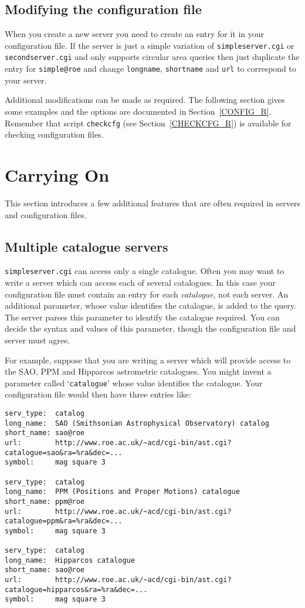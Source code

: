 \documentclass[twoside,11pt]{article}
\newcommand{\xlabel}[1]{}
\renewcommand{\_}{\texttt{\symbol{95}}}
\begin{document}
\subsection{Modifying the configuration file}

When you create a new server you need to create an entry for it in
your configuration file.  If the server is just a simple variation of
{\tt simpleserver.cgi} or {\tt secondserver.cgi} and only supports
circular area queries then just duplicate the entry for {\tt simple@roe}
and change {\tt long\_name}, {\tt short\_name} and {\tt url} to correspond
to your server.

Additional modifications can be made as required.  The following section
gives some examples and the options are documented in
Section~\ref{CONFIG_R}.  Remember that script {\tt checkcfg} (see
Section~\ref{CHECKCFG_R}) is available for checking configuration files.


\section{\xlabel{CARRYON_T}\label{CARRYON_T}Carrying On}

This section introduces a few additional features that are often
required in servers and configuration files.

\subsection{Multiple catalogue servers}

{\tt simpleserver.cgi} can access only a single catalogue.  Often you
may want to write a server which can access each of several catalogues.
In this case your configuration file must contain an entry for each
{\it catalogue}, not each server.  An additional parameter, whose value
identifies the catalogue, is added to the query.  The server parses this
parameter to identify the catalogue required.  You can decide the
syntax and values of this parameter, though the configuration file and
server must agree.

For example, suppose that you are writing a server which will provide
access to the SAO, PPM and Hipparcos astrometric catalogues.  You might
invent a parameter called `{\tt catalogue}' whose value identifies the
catalogue.  Your configuration file would then have three entries like:

{\small
\begin{verbatim}
serv_type:  catalog
long_name:  SAO (Smithsonian Astrophysical Observatory) catalog
short_name: sao@roe
url:        http://www.roe.ac.uk/~acd/cgi-bin/ast.cgi?catalogue=sao&ra=%ra&dec=...
symbol:     mag square 3

serv_type:  catalog
long_name:  PPM (Positions and Proper Motions) catalogue
short_name: ppm@roe
url:        http://www.roe.ac.uk/~acd/cgi-bin/ast.cgi?catalogue=ppm&ra=%ra&dec=...
symbol:     mag square 3

serv_type:  catalog
long_name:  Hipparcos catalogue
short_name: sao@roe
url:        http://www.roe.ac.uk/~acd/cgi-bin/ast.cgi?catalogue=hipparcos&ra=%ra&dec=...
symbol:     mag square 3
\end{verbatim}
}
\end{document}
